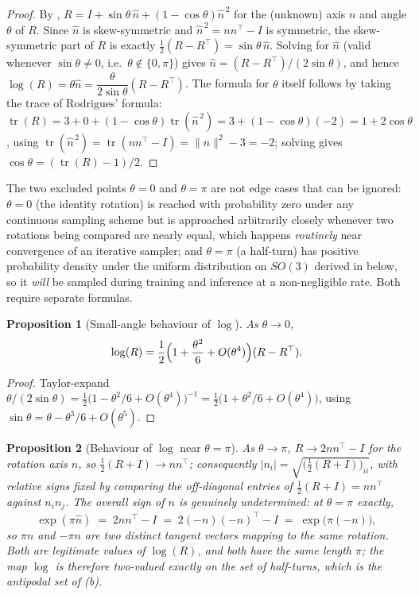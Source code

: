 \documentclass[11pt,a4paper]{report}
\newtheorem{proposition}[proposition]{Proposition}
\theoremstyle{definition}
\theoremstyle{remark}
\DeclareMathOperator{\tr}{tr}
\begin{document}
\begin{proof}
By , $R=I+\sin\theta\,\widehat n+(1-\cos\theta)\widehat n^{\,2}$
for the (unknown) axis $n$ and angle $\theta$ of $R$. Since $\widehat n$ is
skew-symmetric and $\widehat n^{\,2}=nn^\top-I$ is symmetric, the
skew-symmetric part of $R$ is exactly
$\tfrac12(R-R^\top)=\sin\theta\,\widehat n$. Solving for $\widehat n$ (valid
whenever $\sin\theta\ne0$, i.e.\ $\theta\notin\{0,\pi\}$) gives
$\widehat n = (R-R^\top)/(2\sin\theta)$, and hence
$\log(R)=\theta\widehat n = \dfrac{\theta}{2\sin\theta}(R-R^\top)$. The
formula for $\theta$ itself follows by taking the trace of Rodrigues'
formula: $\tr(R)=3+0+(1-\cos\theta)\tr(\widehat n^{\,2})=3+(1-\cos\theta)(-2)=1+2\cos\theta$,
using $\tr(\widehat n^{\,2})=\tr(nn^\top-I)=\|n\|^2-3=-2$; solving gives
$\cos\theta=(\tr(R)-1)/2$.
\end{proof}

The two excluded points $\theta=0$ and $\theta=\pi$ are not edge cases that
can be ignored: $\theta=0$ (the identity rotation) is reached with
probability zero under any continuous sampling scheme but is approached
arbitrarily closely whenever two rotations being compared are nearly equal,
which happens \emph{routinely} near convergence of an iterative sampler; and
$\theta=\pi$ (a half-turn) has positive probability density under the
uniform distribution on $SO(3)$ derived in  below, so it
\emph{will} be sampled during training and inference at a non-negligible
rate. Both require separate formulas.

\begin{proposition}[Small-angle behaviour of $\log$]
\label{prop:log-smallangle}
As $\theta\to0$,
\[
\log(R) = \frac12\Bigl(1+\frac{\theta^2}{6}+O(\theta^4)\Bigr)(R-R^\top) .
\]
\end{proposition}

\begin{proof}
Taylor-expand $\theta/(2\sin\theta) = \tfrac12\bigl(1-\theta^2/6+O(\theta^4)\bigr)^{-1}
= \tfrac12\bigl(1+\theta^2/6+O(\theta^4)\bigr)$, using $\sin\theta=\theta-\theta^3/6+O(\theta^5)$.
\end{proof}

\begin{proposition}[Behaviour of $\log$ near $\theta=\pi$]
\label{prop:log-nearpi}
As $\theta\to\pi$, $R\to 2nn^\top-I$ for the rotation axis $n$, so
$\tfrac12(R+I)\to nn^\top$; consequently $|n_i|=\sqrt{\bigl(\tfrac12(R+I)\bigr)_{ii}}$,
with relative signs fixed by comparing the off-diagonal entries of
$\tfrac12(R+I)=nn^\top$ against $n_in_j$. The overall sign of $n$ is
\emph{genuinely undetermined}: at $\theta=\pi$ exactly,
\[
\exp(\pi\widehat n) \;=\; 2nn^\top-I \;=\; 2(-n)(-n)^\top-I \;=\; \exp\bigl(\pi\widehat{(-n)}\bigr) ,
\]
so $\pi n$ and $-\pi n$ are two distinct tangent vectors mapping to the same
rotation. Both are legitimate values of $\log(R)$, and both have the same
length $\pi$; the map $\log$ is therefore two-valued exactly on the set of
half-turns, which is the antipodal set of (b).
\end{proposition}
\end{document}
